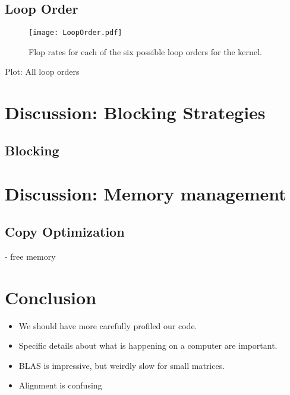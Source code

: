\documentclass{article}
\begin{document}
\subsection{Loop Order}
\begin{figure}
    \centering
    \texttt{[image: LoopOrder.pdf]}
    \caption{Flop rates for each of the six possible loop orders for the kernel.}
    \label{fig:LoopOrder}
\end{figure}

Plot: All loop orders


\section{Discussion: Blocking Strategies}

\subsection{Blocking}


\section{Discussion: Memory management}

\subsection{Copy Optimization}
 - free memory







\section{Conclusion}
\begin{itemize}
	\item We should have more carefully profiled our code. 
	\item Specific details about what is happening on a computer are important.
	\item BLAS is impressive, but weirdly slow for small matrices.
	\item Alignment is confusing
\end{itemize}
\end{document}
